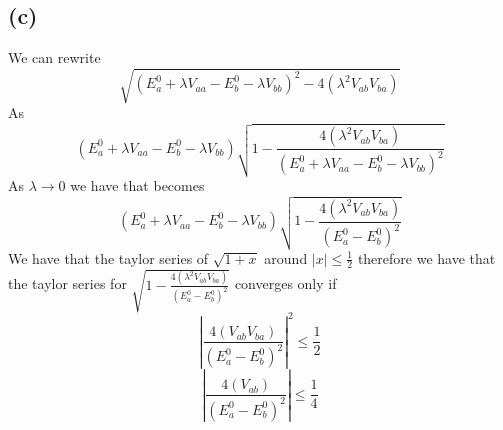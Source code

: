 \documentclass[11pt]{article}
\begin{document}
\subsection*{(c)}
We can rewrite 
$$\sqrt{(E_a^0+\lambda V_{aa}-E_b^0-\lambda V_{bb})^2-4(\lambda^2V_{ab}V_{ba})}$$
As
$$(E_a^0+\lambda V_{aa}-E_b^0-\lambda V_{bb})\sqrt{1-\frac{4(\lambda^2V_{ab}V_{ba})}{(E_a^0+\lambda V_{aa}-E_b^0-\lambda V_{bb})^2}}$$
As $\lambda\to0$ we have that becomes
$$(E_a^0+\lambda V_{aa}-E_b^0-\lambda V_{bb})\sqrt{1-\frac{4(\lambda^2V_{ab}V_{ba})}{(E_a^0-E_b^0)^2}}$$
We have that the taylor series of $\sqrt{1+x}$ around $|x|\leq\frac{1}{2}$ therefore we have that the taylor series for 
$\sqrt{1-\frac{4(\lambda^2V_{ab}V_{ba})}{(E_a^0-E_b^0)^2}}$ converges only if 
$$\left|\frac{4(V_{ab}V_{ba})}{(E_a^0-E_b^0)^2}\right|^2\leq\frac{1}{2}$$
$$\left|\frac{4(V_{ab})}{(E_a^0-E_b^0)^2}\right|\leq\frac{1}{4}$$
\end{document}
